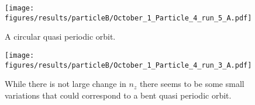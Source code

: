 \begin{figure}[H]
\begin{center}
\texttt{[image: figures/results/particleB/October\_1\_Particle\_4\_run\_5\_A.pdf]}
\end{center}
\caption{A circular quasi periodic orbit.}
\label{fig:particleB3}
\end{figure}

\begin{figure}[H]
\begin{center}
\texttt{[image: figures/results/particleB/October\_1\_Particle\_4\_run\_3\_A.pdf]}
\end{center}
\caption{While there is not large change in $n_z$ there seems to be some small variations that could correspond to a bent quasi periodic orbit.}
\label{fig:particleB4}
\end{figure}


